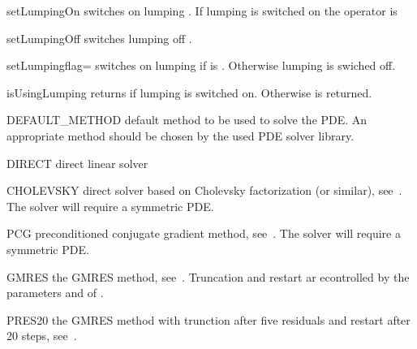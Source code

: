 \begin{methoddesc}[LinearPDE]{setLumpingOn}{}
switches on lumping . If lumping is switched on 
the operator is 
\end{methoddesc}


\begin{methoddesc}[LinearPDE]{setLumpingOff}
switches lumping off .
\end{methoddesc}

\begin{methoddesc}[LinearPDE]{setLumping}{flag=\False}
switches on lumping if  is \True. Otherwise lumping is swiched off.
\end{methoddesc}

\begin{methoddesc}[LinearPDE]{isUsingLumping}{}
returns \True if lumping is switched on. Otherwise \False is returned.
\end{methoddesc}

\begin{memberdesc}[LinearPDE]{DEFAULT_METHOD}
default method to be used to solve the PDE. An appropriate method should be 
chosen by the used PDE solver library.
\end{memberdesc}

\begin{memberdesc}[LinearPDE]{DIRECT}
direct linear solver~ 
\end{memberdesc}

\begin{memberdesc}[LinearPDE]{CHOLEVSKY}
direct solver based on Cholevsky factorization (or similar), see~. The solver will require a symmetric PDE. 
\end{memberdesc}

\begin{memberdesc}[LinearPDE]{PCG}
preconditioned conjugate gradient method, see~. The solver will require a symmetric PDE.
\end{memberdesc}

\begin{memberdesc}[LinearPDE]{GMRES}
the GMRES method, see~. Truncation and restart ar econtrolled by the parameters
 and  of .
\end{memberdesc}

\begin{memberdesc}[LinearPDE]{PRES20}
the GMRES method with trunction after five residuals and
restart after 20 steps, see~.
\end{memberdesc}

